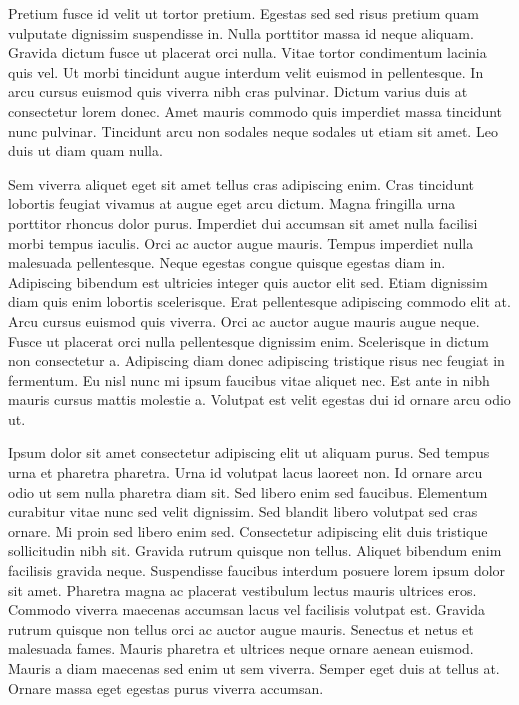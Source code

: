 \documentclass[11pt,a4paper]{article}
\begin{document}
Pretium fusce id velit ut tortor pretium. Egestas sed sed risus pretium quam vulputate dignissim suspendisse in. Nulla porttitor massa id neque aliquam. Gravida dictum fusce ut placerat orci nulla. Vitae tortor condimentum lacinia quis vel. Ut morbi tincidunt augue interdum velit euismod in pellentesque. In arcu cursus euismod quis viverra nibh cras pulvinar. Dictum varius duis at consectetur lorem donec. Amet mauris commodo quis imperdiet massa tincidunt nunc pulvinar. Tincidunt arcu non sodales neque sodales ut etiam sit amet. Leo duis ut diam quam nulla.

Sem viverra aliquet eget sit amet tellus cras adipiscing enim. Cras tincidunt lobortis feugiat vivamus at augue eget arcu dictum. Magna fringilla urna porttitor rhoncus dolor purus. Imperdiet dui accumsan sit amet nulla facilisi morbi tempus iaculis. Orci ac auctor augue mauris. Tempus imperdiet nulla malesuada pellentesque. Neque egestas congue quisque egestas diam in. Adipiscing bibendum est ultricies integer quis auctor elit sed. Etiam dignissim diam quis enim lobortis scelerisque. Erat pellentesque adipiscing commodo elit at. Arcu cursus euismod quis viverra. Orci ac auctor augue mauris augue neque. Fusce ut placerat orci nulla pellentesque dignissim enim. Scelerisque in dictum non consectetur a. Adipiscing diam donec adipiscing tristique risus nec feugiat in fermentum. Eu nisl nunc mi ipsum faucibus vitae aliquet nec. Est ante in nibh mauris cursus mattis molestie a. Volutpat est velit egestas dui id ornare arcu odio ut.

Ipsum dolor sit amet consectetur adipiscing elit ut aliquam purus. Sed tempus urna et pharetra pharetra. Urna id volutpat lacus laoreet non. Id ornare arcu odio ut sem nulla pharetra diam sit. Sed libero enim sed faucibus. Elementum curabitur vitae nunc sed velit dignissim. Sed blandit libero volutpat sed cras ornare. Mi proin sed libero enim sed. Consectetur adipiscing elit duis tristique sollicitudin nibh sit. Gravida rutrum quisque non tellus. Aliquet bibendum enim facilisis gravida neque. Suspendisse faucibus interdum posuere lorem ipsum dolor sit amet. Pharetra magna ac placerat vestibulum lectus mauris ultrices eros. Commodo viverra maecenas accumsan lacus vel facilisis volutpat est. Gravida rutrum quisque non tellus orci ac auctor augue mauris. Senectus et netus et malesuada fames. Mauris pharetra et ultrices neque ornare aenean euismod. Mauris a diam maecenas sed enim ut sem viverra. Semper eget duis at tellus at. Ornare massa eget egestas purus viverra accumsan.
\end{document}
